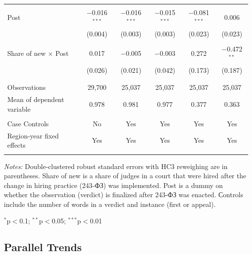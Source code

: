 \documentclass[12pt]{article}
\numberwithin{equation}{section}
\numberwithin{table}{section}
\numberwithin{figure}{section}
\begin{document}
\begin{table}[!htbp]
\begin{threeparttable}
\begin{tabular}{@{\extracolsep{5pt}}lccccc}
& & & & & \\ 
Post & $-$0.016$^{***}$ & $-$0.016$^{***}$ & $-$0.015$^{***}$ & $-$0.081$^{***}$ & 0.006 \\ 
& (0.004) & (0.003) & (0.003) & (0.023) & (0.023) \\ 
& & & & & \\ 
Share of new $\times$ Post & 0.017 & $-$0.005 & $-$0.003 & 0.272 & $-$0.472$^{**}$ \\ 
& (0.026) & (0.021) & (0.042) & (0.173) & (0.187) \\ 
& & & & & \\[-1.8ex]  
\hline \\[-1.8ex] 
Observations & 29,700 & 25,037 & 25,037 & 25,037 & 25,037 \\ 
Mean of dependent variable &0.978& 0.981 &0.977& 0.377& 0.363\\ \hline\\[-1.8ex] 
Case Controls &No &Yes &Yes&Yes&Yes\\ 
Region-year fixed effects &Yes &Yes&Yes&Yes& Yes \\ \\[-1.8ex]  
\hline 
\hline 
  \end{tabular} 
  \begin{tablenotes}[flushleft]
    \item[]\textit{Notes:} Double-clustered robust standard errors \citet{Thompson2011,Cameron2011} with HC3 reweighing are in parentheses. Share of new is a share of judges in a court that were hired after the change in hiring practice (243-ФЗ) was implemented. Post is a dummy on whether the observation (verdict) is finalized after 243-ФЗ was enacted. Сontrols include the number of words in a verdict and instance (first or appeal).
    \item[] $^{*}$p$<$0.1; $^{**}$p$<$0.05; $^{***}$p$<$0.01
  \end{tablenotes}
\end{threeparttable}
  \end{table} 
\newpage
\subsection{Parallel Trends}
\label{sec:Parallel_Trends}
\end{document}
